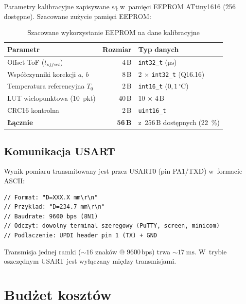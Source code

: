 \documentclass[a4paper,11pt]{article}
\begin{document}
Parametry kalibracyjne zapisywane są w~pamięci EEPROM ATtiny1616
(\SI{256}{\byte} dostępne). Szacowane zużycie pamięci EEPROM:

\begin{table}[H]
    \centering
    \caption{Szacowane wykorzystanie EEPROM na dane kalibracyjne}
    \label{tab:eeprom_usage}
    \begin{tabular}{lrl}
        \toprule
        \textbf{Parametr} & \textbf{Rozmiar} & \textbf{Typ danych} \\
        \midrule
        Offset ToF ($t_{offset}$) & 4\,B & \texttt{int32\_t} ($\si{\micro\second}$) \\
        Współczynniki korekcji $a$, $b$ & 8\,B & 2 $\times$ \texttt{int32\_t} (Q16.16) \\
        Temperatura referencyjna $T_0$ & 2\,B & \texttt{int16\_t} ($0{,}1\,^\circ$C) \\
        LUT wielopunktowa (10~pkt) & 40\,B & 10 $\times$ 4\,B \\
        CRC16 kontrolna & 2\,B & \texttt{uint16\_t} \\
        \midrule
        \textbf{Łącznie} & \textbf{56\,B} & z~256\,B dostępnych (\SI{22}{\percent}) \\
        \bottomrule
    \end{tabular}
\end{table}

\subsection{Komunikacja USART}
\label{sec:usart}

Wynik pomiaru transmitowany jest przez USART0 (pin PA1/TXD) w~formacie ASCII:

\begin{lstlisting}[caption={Format ramki wyjściowej USART}, label={lst:uart_frame}]
// Format: "D=XXX.X mm\r\n"
// Przyklad: "D=234.7 mm\r\n"
// Baudrate: 9600 bps (8N1)
// Odczyt: dowolny terminal szeregowy (PuTTY, screen, minicom)
// Podlaczenie: UPDI header pin 1 (TX) + GND
\end{lstlisting}

Transmisja jednej ramki (${\sim}16$ znaków @ 9600\,bps) trwa ${\sim}\SI{17}{\milli\second}$.
W~trybie oszczędnym USART jest wyłączany między transmisjami.


\section{Budżet kosztów}
\label{sec:koszty}
\end{document}
